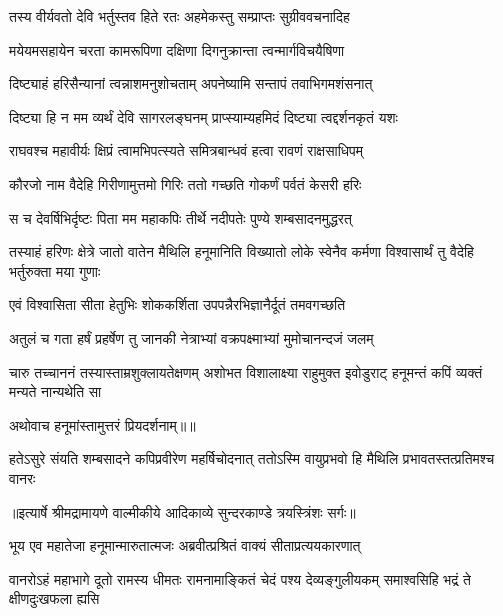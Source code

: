\twolineshloka
{तस्य वीर्यवतो देवि भर्तुस्तव हिते रतः}
{अहमेकस्तु सम्प्राप्तः सुग्रीववचनादिह} %

\twolineshloka
{मयेयमसहायेन चरता कामरूपिणा}
{दक्षिणा दिगनुक्रान्ता त्वन्मार्गविचयैषिणा} %

\twolineshloka
{दिष्ट्याहं हरिसैन्यानां त्वन्नाशमनुशोचताम्}
{अपनेष्यामि सन्तापं तवाभिगमशंसनात्} %

\twolineshloka
{दिष्ट्या हि न मम व्यर्थं देवि सागरलङ्घनम्}
{प्राप्स्याम्यहमिदं दिष्ट्या त्वद्दर्शनकृतं यशः} %

\twolineshloka
{राघवश्च महावीर्यः क्षिप्रं त्वामभिपत्स्यते}
{समित्रबान्धवं हत्वा रावणं राक्षसाधिपम्} %

\twolineshloka
{कौरजो नाम वैदेहि गिरीणामुत्तमो गिरिः}
{ततो गच्छति गोकर्णं पर्वतं केसरी हरिः} %

\twolineshloka
{स च देवर्षिभिर्दृष्टः पिता मम महाकपिः}
{तीर्थे नदीपतेः पुण्ये शम्बसादनमुद्धरत्} %

\threelineshloka
{तस्याहं हरिणः क्षेत्रे जातो वातेन मैथिलि}
{हनूमानिति विख्यातो लोके स्वेनैव कर्मणा}
{विश्वासार्थं तु वैदेहि भर्तुरुक्ता मया गुणाः} %

\twolineshloka
{एवं विश्वासिता सीता हेतुभिः शोककर्शिता}
{उपपन्नैरभिज्ञानैर्दूतं तमवगच्छति} %

\twolineshloka
{अतुलं च गता हर्षं प्रहर्षेण तु जानकी}
{नेत्राभ्यां वक्रपक्ष्माभ्यां मुमोचानन्दजं जलम्} %

\threelineshloka
{चारु तच्चाननं तस्यास्ताम्रशुक्लायतेक्षणम्}
{अशोभत विशालाक्ष्या राहुमुक्त इवोडुराट्}
{हनूमन्तं कपिं व्यक्तं मन्यते नान्यथेति सा} %

{अथोवाच हनूमांस्तामुत्तरं प्रियदर्शनाम्॥॥} %

\addtocounter{shlokacount}{1}

\fourlineindentedshloka
{हतेऽसुरे संयति शम्बसादने}
{कपिप्रवीरेण महर्षिचोदनात्}
{ततोऽस्मि वायुप्रभवो हि मैथिलि}
{प्रभावतस्तत्प्रतिमश्च वानरः} %


{॥इत्यार्षे श्रीमद्रामायणे वाल्मीकीये आदिकाव्ये सुन्दरकाण्डे त्रयस्त्रिंशः सर्गः॥}


\twolineshloka
{भूय एव महातेजा हनूमान्मारुतात्मजः}
{अब्रवीत्प्रश्रितं वाक्यं सीताप्रत्ययकारणात्} %

\threelineshloka
{वानरोऽहं महाभागे दूतो रामस्य धीमतः}
{रामनामाङ्कितं चेदं पश्य देव्यङ्गुलीयकम्}
{समाश्वसिहि भद्रं ते क्षीणदुःखफला ह्यसि} %

